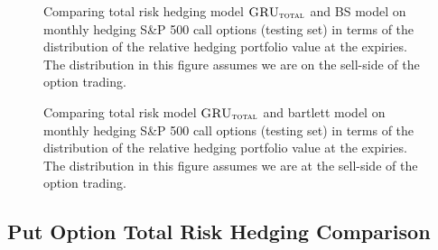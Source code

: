 \documentclass[letterpaper,12pt,titlepage,oneside,final]{book}
\numberwithin{equation}{section}
\theoremstyle{definition}
\newcommand{\modelT}{\textsc{GRU}_{\textsc{total}}}
\begin{document}
\begin{figure}[htp!]
	\caption{Comparing total risk hedging model $\modelT$ and BS model  on monthly hedging S\&P 500 call options (testing set) in terms of the distribution of the  relative hedging portfolio value at the expiries. The distribution in this figure assumes we are on the sell-side of the option trading.} 
	\label{fig:CallTotalM2}
		\centering
	\caption{Comparing total risk model $\modelT$ and bartlett model on monthly hedging S\&P 500 call options (testing set) in terms of the distribution of the  relative hedging portfolio value at the expiries. The distribution in this figure assumes we are at the sell-side of the option trading.} \label{fig:CallTotalM3}
\end{figure}

\newpage
\subsection{Put Option Total Risk Hedging Comparison}
\end{document}
